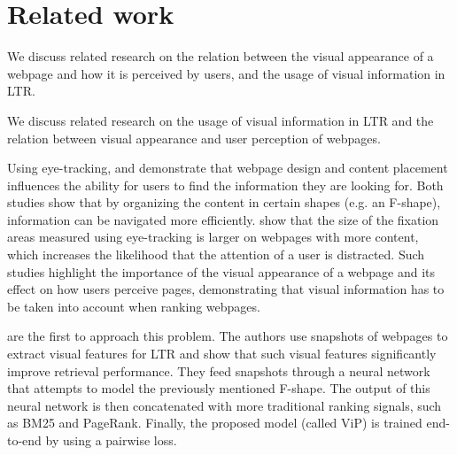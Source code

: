 
\section{Related work}
\label{sec:relatedwork}

We discuss related research on the relation between the visual appearance of a webpage and how it is perceived by users, and the usage of visual information in \ac{LTR}.

We discuss related research on the usage of visual information in \ac{LTR} and the relation between visual appearance and user perception of webpages.


Using eye-tracking, \citet{nielsen2006f} and \citet{pernice2017f} demonstrate that webpage design and content placement influences the ability for users to find the information they are looking for. 
Both studies show that by organizing the content in certain shapes (e.g. an F-shape), information can be  navigated more efficiently.
\citet{wang2014eye} show that the size of the fixation areas measured using eye-tracking is larger on webpages with more content, which increases the likelihood that the attention of a user is distracted.
Such studies highlight the importance of the visual appearance of a webpage and its effect on how users perceive pages, demonstrating that visual information has to be taken into account when ranking webpages.

\citet{fan2017learning} are the first to approach this problem.
The authors use snapshots of webpages to extract visual features for LTR
and show that such visual features significantly improve retrieval performance.
They feed snapshots through a neural network that attempts to model the previously mentioned F-shape.
The output of this neural network is then concatenated with more traditional ranking signals, such as BM25 and PageRank.
Finally, the proposed model (called ViP) is trained end-to-end by using a pairwise loss.

